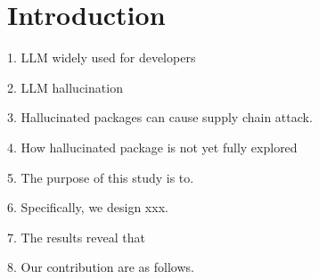 \section{Introduction}



1. LLM widely used for developers

2. LLM hallucination

3. Hallucinated packages can cause supply chain attack. 

4. How hallucinated package is not yet fully explored

5. The purpose of this study is to. 

6. Specifically, we design xxx. 

7. The results reveal that 

8. Our contribution are as follows.
